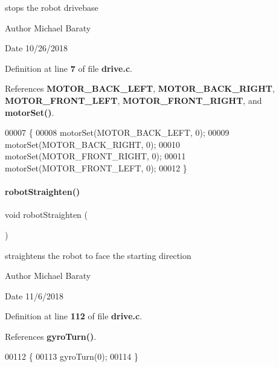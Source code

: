stops the robot drivebase 

\begin{DoxyAuthor}{Author}
Michael Baraty 
\end{DoxyAuthor}
\begin{DoxyDate}{Date}
10/26/2018 
\end{DoxyDate}


Definition at line \textbf{ 7} of file \textbf{ drive.\+c}.



References \textbf{ M\+O\+T\+O\+R\+\_\+\+B\+A\+C\+K\+\_\+\+L\+E\+FT}, \textbf{ M\+O\+T\+O\+R\+\_\+\+B\+A\+C\+K\+\_\+\+R\+I\+G\+HT}, \textbf{ M\+O\+T\+O\+R\+\_\+\+F\+R\+O\+N\+T\+\_\+\+L\+E\+FT}, \textbf{ M\+O\+T\+O\+R\+\_\+\+F\+R\+O\+N\+T\+\_\+\+R\+I\+G\+HT}, and \textbf{ motor\+Set()}.


\begin{DoxyCode}
00007                  \{
00008   motorSet(MOTOR_BACK_LEFT, 0);
00009   motorSet(MOTOR_BACK_RIGHT, 0);
00010   motorSet(MOTOR_FRONT_RIGHT, 0);
00011   motorSet(MOTOR_FRONT_LEFT, 0);
00012 \}
\end{DoxyCode}
\mbox{\label{drive_8h_a53fb069f33735f517bdff54c69b8e860}} 
\paragraph{robot\+Straighten()}
{\footnotesize\ttfamily void robot\+Straighten (\begin{DoxyParamCaption}{ }\end{DoxyParamCaption})}



straightens the robot to face the starting direction 

\begin{DoxyAuthor}{Author}
Michael Baraty 
\end{DoxyAuthor}
\begin{DoxyDate}{Date}
11/6/2018 
\end{DoxyDate}


Definition at line \textbf{ 112} of file \textbf{ drive.\+c}.



References \textbf{ gyro\+Turn()}.


\begin{DoxyCode}
00112                        \{
00113   gyroTurn(0);
00114 \}
\end{DoxyCode}
